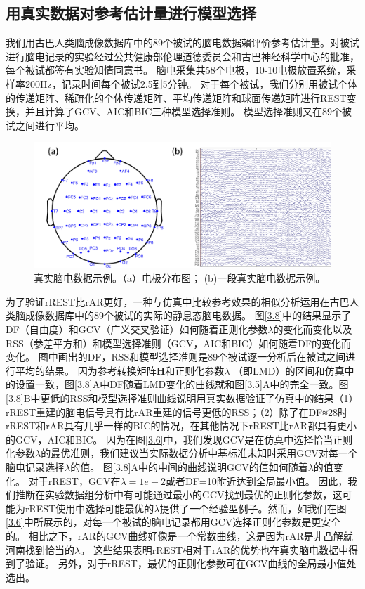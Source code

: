\subsection{用真实数据对参考估计量进行模型选择}
我们用古巴人类脑成像数据库中的89个被试的脑电数据賴评价参考估计量。对被试进行脑电记录的实验经过公共健康部伦理道德委员会和古巴神经科学中心的批准，每个被试都签有实验知情同意书。 脑电采集共58个电极，10-10电极放置系统，采样率200Hz，记录时间每个被试2.5到5分钟。 对于每个被试，我们分别用被试个体的传递矩阵、稀疏化的个体传递矩阵、平均传递矩阵和球面传递矩阵进行REST变换，并且计算了GCV、AIC和BIC三种模型选择准则。 模型选择准则又在89个被试之间进行平均。 
\begin{figure}[!ht]
	\centering
	\includegraphics[width=15cm]{pic/Frontier/figure7.png}
	\caption{真实脑电数据示例。（a）电极分布图； (b)一段真实脑电数据示例。}
	\label{3.7}
\end{figure}
为了验证rREST比rAR更好，一种与仿真中比较参考效果的相似分析运用在古巴人类脑成像数据库中的89个被试的实际的静息态脑电数据。 图\ref{3.8}中的结果显示了DF（自由度）和GCV（广义交叉验证）如何随着正则化参数$\lambda$的变化而变化以及RSS（参差平方和）和模型选择准则（GCV，AIC和BIC）如何随着DF的变化而变化。 图中画出的DF，RSS和模型选择准则是89个被试逐一分析后在被试之间进行平均的结果。 因为参考转换矩阵$\mathbf{H}$和正则化参数$\lambda$ （即LMD）的区间和仿真中的设置一致，图\ref{3.8}A中DF随着LMD变化的曲线就和图\ref{3.5}A中的完全一致。图\ref{3.8}B中更低的RSS和模型选择准则曲线说明用真实数据验证了仿真中的结果（1）rREST重建的脑电信号具有比rAR重建的信号更低的RSS；（2）除了在DF≈28时rREST和rAR具有几乎一样的BIC的情况，在其他情况下rREST比rAR都具有更小的GCV，AIC和BIC。 因为在图\ref{3.6}中，我们发现GCV是在仿真中选择恰当正则化参数$\lambda$的最优准则，我们建议当实际数据分析中基标准未知时采用GCV对每一个脑电记录选择$\lambda$的值。 图\ref{3.8}A中的中间的曲线说明GCV的值如何随着$\lambda$的值变化。 对于rREST，GCV在$\lambda=1e-2$或者DF=10附近达到全局最小值。 因此，我们推断在实验数据组分析中有可能通过最小的GCV找到最优的正则化参数，这可能为rREST使用中选择可能最优的$\lambda$提供了一个经验型例子。然而，如我们在图\ref{3.6}中所展示的，对每一个被试的脑电记录都用GCV选择正则化参数是更安全的。 相比之下，rAR的GCV曲线好像是一个常数曲线，这是因为rAR是非凸解就河南找到恰当的$\lambda$。 这些结果表明rREST相对于rAR的优势也在真实脑电数据中得到了验证。 另外，对于rREST，最优的正则化参数可在GCV曲线的全局最小值处选出。

